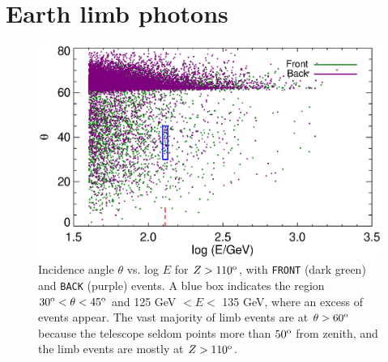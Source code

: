 \documentclass[aps,twocolumn,prd,superscriptaddress,showpacs,nofootinbib,fixfloat]{revtex4}
\newcommand{\degree}{^{\rm o}}
\begin{document}
% 

\section{Earth limb photons}
\label{sec:EarthLimb}

\begin{figure}
  \centering
  \includegraphics[width=1.0\linewidth]{plots/theta-E-frontback.ps}
  \caption{Incidence angle $\theta$ vs. log $E$ for $Z >
    110\degree$, with \texttt{FRONT} (dark green) and \texttt{BACK} (purple)
    events. A blue box indicates the region $30\degree <
    \theta < 45\degree$ and 125 GeV $< E <$ 135 GeV, where
    an excess of events appear.  The vast majority of limb
    events are at $\theta > 60\degree$ because the telescope
    seldom points more than $50\degree$ from zenith, and the
    limb events are mostly at $Z>110\degree$. }
  \label{fig:theta-E-frontback}
\end{figure}
\end{document}
